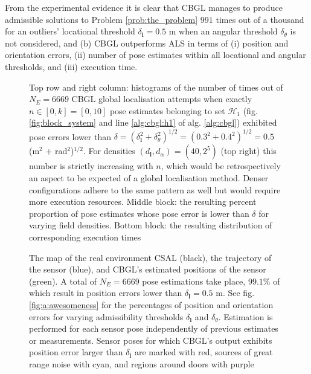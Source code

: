 From the experimental evidence it is clear that CBGL manages to produce
admissible solutions to Problem \ref{prob:the_problem} $991$ times out of a
thousand for an outliers' locational threshold $\delta_{\bm{l}} = 0.5$ m when
an angular threshold $\delta_{\theta}$ is not considered, and (b) CBGL
outperforms ALS in terms of (i) position and orientation errors, (ii) number of
pose estimates within all locational and angular thresholds, and (iii) execution
time.


\begin{figure}
  \vspace{-0.3cm}
  
  \vspace{-0.3cm}
  \caption{\small Top row and right column: histograms of the number of times
           out of $N_E = 6669$ CBGL global localisation attempts
           when exactly $n \in [0,k] = [0,10]$ pose estimates belonging to set
           $\mathcal{H}_1$ (fig. \ref{fig:block_system} and line
           \ref{alg:cbgl:h1} of alg. \ref{alg:cbgl}) exhibited pose errors
           lower than $\delta = (\delta_{\bm{l}}^2 + \delta_{\theta}^2)^{1/2} =
           (0.3^2 + 0.4^2)^{1/2} = 0.5$ (m$^2$ + rad$^2$)$^{1/2}$. For
           densities $(d_{\bm{l}},d_{\alpha}) = (40, 2^5)$ (top right) this
           number is strictly increasing with $n$, which would be
           retrospectively an aspect to be expected of a global localisation
           method. Denser configurations adhere to the same pattern as well but
           would require more execution resources. Middle block: the resulting
           percent proportion of pose estimates whose pose error is lower than
           $\delta$ for varying field densities. Bottom block: the resulting
           distribution of corresponding execution times
           }
  \vspace{-0.5cm}
  \label{fig:a:determine_40_32}
\end{figure}


\begin{figure}
  \vspace{-1.2cm}
  
  \vspace{-0.7cm}
  \caption{\small The map of the real environment CSAL (black), the trajectory
           of the sensor (blue), and CBGL's estimated positions of the sensor
           (green). A total of $N_E = 6669$ pose estimations take place,
           $99.1\%$ of which result in position errors lower than
           $\delta_{\bm{l}} = 0.5$ m. See fig. \ref{fig:a:awesomeness}
           for the percentages of position and orientation errors for varying
           admissibility thresholds $\delta_{\bm{l}}$ and $\delta_{\theta}$.
           Estimation is performed for each sensor
           pose independently of previous estimates or measurements. Sensor
           poses for which CBGL's output exhibits position error larger than
           $\delta_{\bm{l}}$ are marked with red, sources of great
           range noise with cyan, and regions around doors with purple
           }
  \label{fig:a:map_and_trajectory}
  \vspace{-0.5cm}
\end{figure}

